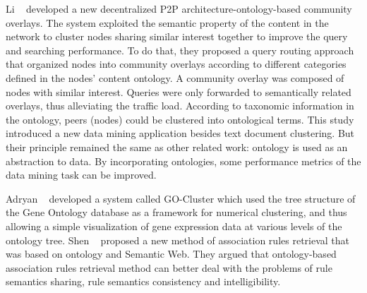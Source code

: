 Li \etal~\cite{Li2005Ont} developed a new decentralized P2P architecture-ontology-based community overlays. The system exploited the semantic property of the content in the network to cluster nodes sharing similar interest together to improve the query and searching performance. To do that, they proposed a query routing approach that organized nodes into community overlays according to different categories defined in the nodes' content ontology. A community overlay was composed of nodes with similar interest. Queries were only forwarded to semantically related overlays, thus alleviating the traffic load. According to taxonomic information in the ontology, peers (nodes) could be clustered into ontological terms. This study introduced a new data mining application besides text document clustering. But their principle remained the same as other related work: ontology is used as an abstraction to data. By incorporating ontologies, some performance metrics of the data mining task can be improved.

Adryan \etal~\cite{Adryan2004} developed a system called GO-Cluster which used the tree structure of the Gene Ontology database as a framework for numerical clustering, and thus allowing a simple visualization of gene expression data at various levels of the ontology tree. Shen \etal~\cite{Shen2006Ont} proposed a new method of association rules retrieval that was based on ontology and Semantic Web. They argued that ontology-based association rules retrieval method can better deal with the problems of rule semantics sharing, rule semantics consistency and intelligibility.

